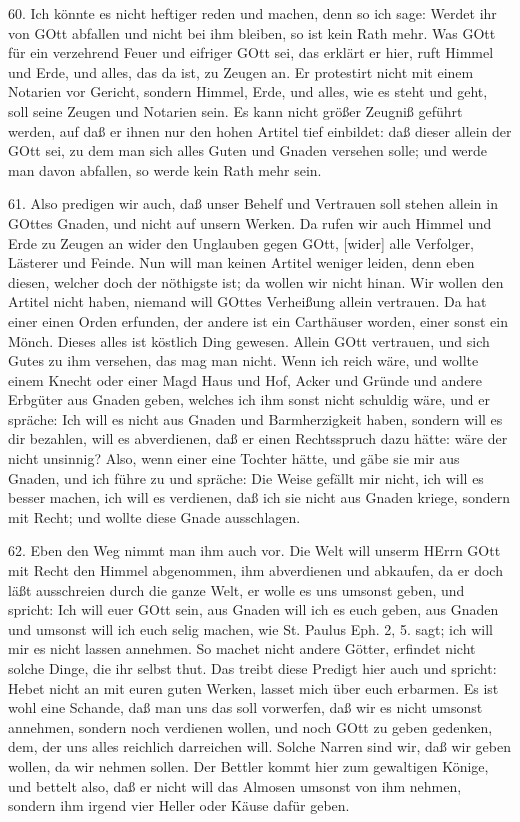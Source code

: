 60. Ich könnte es nicht heftiger reden und machen, denn so ich sage: Werdet ihr von GOtt abfallen und nicht bei ihm bleiben, so ist kein Rath mehr. Was GOtt für ein verzehrend Feuer und eifriger GOtt sei, das erklärt er hier, ruft Himmel und Erde, und alles, das da ist, zu Zeugen an. Er protestirt nicht mit einem Notarien vor Gericht, sondern Himmel, Erde, und alles, wie es steht und geht, soll seine Zeugen und Notarien sein. Es kann nicht größer Zeugniß geführt werden, auf daß er ihnen nur den hohen Artitel tief einbildet: daß dieser allein der GOtt sei, zu dem man sich alles Guten und Gnaden versehen solle; und werde man davon abfallen, so werde kein Rath mehr sein.

61. Also predigen wir auch, daß unser Behelf und Vertrauen soll stehen allein in GOttes Gnaden, und nicht auf unsern Werken. Da rufen wir auch Himmel und Erde zu Zeugen an wider den Unglauben gegen GOtt, [wider] alle Verfolger, Lästerer und Feinde. Nun will man keinen Artitel weniger leiden, denn eben diesen, welcher doch der nöthigste ist; da wollen wir nicht hinan. Wir wollen den Artitel nicht haben, niemand will GOttes Verheißung allein vertrauen. Da hat einer einen Orden erfunden, der andere ist ein Carthäuser worden, einer sonst ein Mönch. Dieses alles ist köstlich Ding gewesen. Allein GOtt vertrauen, und sich Gutes zu ihm versehen, das mag man nicht. Wenn ich reich wäre, und wollte einem Knecht oder einer Magd Haus und Hof, Acker und Gründe und andere Erbgüter aus Gnaden geben, welches ich ihm sonst nicht schuldig wäre, und er spräche: Ich will es nicht aus Gnaden und Barmherzigkeit haben, sondern will es dir bezahlen, will es abverdienen, daß er einen Rechtsspruch dazu hätte: wäre der nicht unsinnig? Also, wenn einer eine Tochter hätte, und gäbe sie mir aus Gnaden, und ich führe zu und spräche: Die Weise gefällt mir nicht, ich will es besser machen, ich will es verdienen, daß ich sie nicht aus Gnaden kriege, sondern mit Recht; und wollte diese Gnade ausschlagen.

62. Eben den Weg nimmt man ihm auch vor. Die Welt will unserm HErrn GOtt mit Recht den Himmel abgenommen, ihm abverdienen und abkaufen, da er doch läßt ausschreien durch die ganze Welt, er wolle es uns umsonst geben, und spricht: Ich will euer GOtt sein, aus Gnaden will ich es euch geben, aus Gnaden und umsonst will ich euch selig machen, wie St. Paulus Eph. 2, 5. sagt; ich will mir es nicht lassen annehmen. So machet nicht andere Götter, erfindet nicht solche Dinge, die ihr selbst thut. Das treibt diese Predigt hier auch und spricht: Hebet nicht an mit euren guten Werken, lasset mich über euch erbarmen. Es ist wohl eine Schande, daß man uns das soll vorwerfen, daß wir es nicht umsonst annehmen, sondern noch verdienen wollen, und noch GOtt zu geben gedenken, dem, der uns alles reichlich darreichen will. Solche Narren sind wir, daß wir geben wollen, da wir nehmen sollen. Der Bettler kommt hier zum gewaltigen Könige, und bettelt also, daß er nicht will das Almosen umsonst von ihm nehmen, sondern ihm irgend vier Heller oder Käuse dafür geben.

